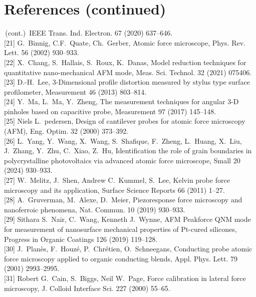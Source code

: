 \documentclass[11pt]{article}
\begin{document}
\section*{References (continued)}

\begin{footnotesize}
\noindent
[20]\,(cont.)\ IEEE Trans. Ind. Electron. 67 (2020) 637--646.\\[2pt]
[21] G.~Binnig, C.F.~Quate, Ch.~Gerber, Atomic force microscope,
Phys. Rev. Lett. 56 (2002) 930--933.\\[2pt]
[22] X.~Chang, S.~Hallais, S.~Roux, K.~Danas, Model reduction
techniques for quantitative nano-mechanical AFM mode, Meas. Sci.
Technol. 32 (2021) 075406.\\[2pt]
[23] D.-H.~Lee, 3-Dimensional profile distortion measured by stylus
type surface profilometer, Measurement 46 (2013) 803--814.\\[2pt]
[24] Y.~Ma, L.~Ma, Y.~Zheng, The measurement techniques for angular
3-D pinholes based on capacitive probe, Measurement 97 (2017)
145--148.\\[2pt]
[25] Niels L.~pedersen, Design of cantilever probes for atomic
force microscopy (AFM), Eng. Optim. 32 (2000) 373--392.\\[2pt]
[26] L.~Yang, Y.~Wang, X.~Wang, S.~Shafique, F.~Zheng, L.~Huang,
X.~Liu, J.~Zhang, Y.~Zhu, C.~Xiao, Z.~Hu, Identification the role
of grain boundaries in polycrystalline photovoltaics via advanced
atomic force microscope, Small 20 (2024) 930--933.\\[2pt]
[27] W.~Melitz, J.~Shen, Andrew C.~Kummel, S.~Lee, Kelvin probe
force microscopy and its application, Surface Science Reports 66
(2011) 1--27.\\[2pt]
[28] A.~Gruverman, M.~Alexe, D.~Meier, Piezoresponse force
microscopy and nanoferroic phenomena, Nat. Commun. 10 (2019)
930--933.\\[2pt]
[29] Sithara S.~Nair, C.~Wang, Kenneth J.~Wynne, AFM Peakforce QNM
mode for measurement of nanosurface mechanical properties of
Pt-cured silicones, Progress in Organic Coatings 126 (2019)
119--128.\\[2pt]
[30] J.~Planès, F.~Houzé, P.~Chrétien, O.~Schneegans, Conducting
probe atomic force microscopy applied to organic conducting blends,
Appl. Phys. Lett. 79 (2001) 2993--2995.\\[2pt]
[31] Robert G.~Cain, S.~Biggs, Neil W.~Page, Force calibration in
lateral force microscopy, J. Colloid Interface Sci. 227 (2000)
55--65.\\[2pt]

\end{footnotesize}
\end{document}
